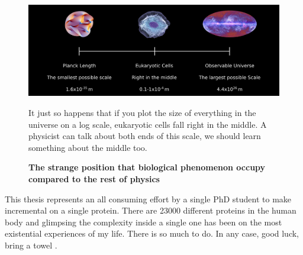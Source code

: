 \begin{figure}
	\begin{center}
		\includegraphics[width=1.0\textwidth]{figures/scales.png}
	\end{center}
	\captionsetup{singlelinecheck = false, justification=raggedright}
	\caption[The strange position that biological phenomenon occupy compared to the rest of physics] {\textbf{The strange position that biological phenomenon occupy compared to the rest of physics}}{It just so happens that if you plot the size of everything  in the universe on a log scale, eukaryotic cells fall right in the middle. A physicist can talk about both ends of this scale, we should learn something about the middle too.}
	\label{biology_scales}
\end{figure}

This thesis represents an all consuming effort by a single PhD student to make incremental on a single protein. There are 23000 different proteins in the human body and glimpsing the complexity inside a single one has been on the most existential experiences of my life. There is so much to do. In any case, good luck, bring a towel \cite{adams1979}. 
